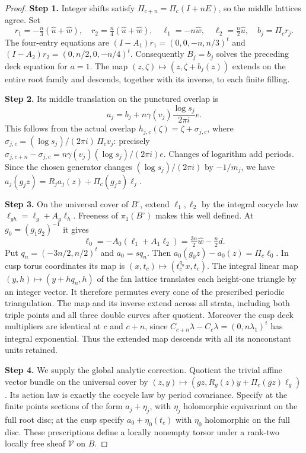 \begin{proof}
\par\smallskip\noindent\textbf{Step 1.} Integer shifts satisfy $\Pi_{c+n}=\Pi_c(I+nE)$, so the middle lattices agree. Set
\[
 r_1=-\tfrac n3(\widehat u+\widehat w),\quad
 r_2=\tfrac n4(\widehat u+\widehat w),\quad
 \ell_1=-n\widehat w,\quad \ell_2=\tfrac n2\widehat u,\quad b_j=\Pi_cr_j.
\]
The four-entry equations are $(I-A_1)r_1=(0,0,-n,n/3)^t$ and $(I-A_2)r_2=(0,n/2,0,-n/4)^t$. Consequently $B_j=b_j$ solves the preceding deck equation for $a=1$. The map $(z,\zeta)\mapsto(z,\zeta+b_j(z))$ extends on the entire root family and descends, together with its inverse, to each finite filling.

\par\smallskip\noindent\textbf{Step 2.} Its middle translation on the punctured overlap is
\[
 a_j=b_j+n\gamma(v_j)\frac{\log s_j}{2\pi i}e.
\]
This follows from the actual overlap $h_{j,c}(\zeta)=\zeta+\sigma_{j,c}$, where $\sigma_{j,c}=(\log s_j)/(2\pi i)\,\Pi_cv_j$: precisely $\sigma_{j,c+n}-\sigma_{j,c}=n\gamma(v_j)(\log s_j)/(2\pi i)e$. Changes of logarithm add periods. Since the chosen generator changes $(\log s_j)/(2\pi i)$ by $-1/m_j$, we have $a_j(g_jz)=R_ja_j(z)+\Pi_c(g_jz)\ell_j$.

\par\smallskip\noindent\textbf{Step 3.} On the universal cover of $B^\circ$, extend $\ell_1,\ell_2$ by the integral cocycle law $\ell_{gh}=\ell_g+A_g\ell_h$. Freeness of $\pi_1(B^\circ)$ makes this well defined. At $g_0=(g_1g_2)^{-1}$ it gives
\[
 \ell_0=-A_0(\ell_1+A_1\ell_2)=\tfrac{3n}2\widehat w-\tfrac n2d.
\]
Put $q_n=(-3n/2,n/2)^t$ and $a_0=sq_n$. Then $a_0(g_0z)-a_0(z)=\Pi_c\ell_0$. In cusp torus coordinates its map is $(x,t_c)\mapsto(t_c^{q_n}x,t_c)$. The integral linear map $(y,h)\mapsto(y+hq_n,h)$ of the fan lattice translates each height-one triangle by an integer vector. It therefore permutes every cone of the prescribed periodic triangulation. The map and its inverse extend across all strata, including both triple points and all three double curves after quotient. Moreover the cusp deck multipliers are identical at $c$ and $c+n$, since $C_{c+n}\lambda-C_c\lambda=(0,n\lambda_1)^t$ has integral exponential. Thus the extended map descends with all its nonconstant units retained.

\par\smallskip\noindent\textbf{Step 4.} We supply the global analytic correction. Quotient the trivial affine vector bundle on the universal cover by
$(z,y)\mapsto(gz,R_g(z)y+\Pi_c(gz)\ell_g)$. Its action law is exactly the cocycle law by period covariance. Specify at the finite points sections of the form $a_j+\eta_j$, with $\eta_j$ holomorphic equivariant on the full root disc; at the cusp specify $a_0+\eta_0(t_c)$ with $\eta_0$ holomorphic on the full disc. These prescriptions define a locally nonempty torsor under a rank-two locally free sheaf $\mathcal V$ on $B$.


\end{proof}
